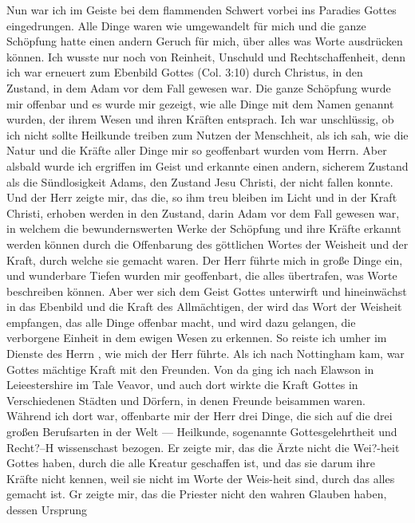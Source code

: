 Nun war ich im Geiste bei dem flammenden Schwert vorbei
ins Paradies Gottes eingedrungen. Alle Dinge waren wie 
umgewandelt für mich und die ganze Schöpfung hatte einen andern
Geruch für mich, über alles was Worte ausdrücken können. Ich
wusste nur noch von Reinheit, Unschuld und Rechtschaffenheit, denn
ich war erneuert zum Ebenbild Gottes 
(Col. 3:10) durch Christus,
in den Zustand, in dem Adam vor dem Fall gewesen 
war. Die
ganze Schöpfung wurde mir offenbar und es wurde mir gezeigt,
wie alle Dinge mit dem Namen genannt wurden, der ihrem
Wesen und ihren Kräften entsprach. Ich war unschlüssig, ob ich
nicht sollte Heilkunde treiben zum Nutzen 
der Menschheit, als ich
sah, wie die Natur und die Kräfte aller Dinge mir so geoffenbart
wurden vom Herrn. Aber alsbald wurde ich ergriffen im Geist
und erkannte einen andern, sicherem Zustand als die Sündlosigkeit 
Adams, den Zustand Jesu Christi, der nicht fallen konnte.
Und der Herr zeigte mir, das die, so ihm treu bleiben im Licht
und in der Kraft Christi, erhoben werden in den Zustand, darin
Adam vor dem Fall gewesen war, in welchem die bewundernswerten 
Werke der Schöpfung und ihre Kräfte erkannt werden
können durch die Offenbarung des göttlichen Wortes der 
Weisheit und der Kraft, durch welche sie gemacht waren. Der Herr
führte mich in große Dinge ein, und wunderbare Tiefen wurden
mir geoffenbart, die alles übertrafen, was Worte beschreiben
können. Aber wer sich dem Geist Gottes unterwirft und 
hineinwächst in das Ebenbild und die Kraft des Allmächtigen, der wird
das Wort der Weisheit empfangen, das alle Dinge offenbar macht,
und wird dazu gelangen, die verborgene Einheit in dem ewigen
Wesen zu erkennen.
So reiste ich umher im Dienste des Herrn , wie mich der
Herr führte. Als ich nach Nottingham kam, war Gottes mächtige
Kraft mit den Freunden. Von da ging ich nach Elawson in
Leieestershire im Tale Veavor, und auch dort wirkte die Kraft
Gottes in Verschiedenen Städten und Dörfern, in denen Freunde
beisammen waren. Während ich dort war, offenbarte mir der
Herr drei Dinge, die sich auf die drei großen Berufsarten in der
Welt — Heilkunde, sogenannte Gottesgelehrtheit und Recht?--H
wissenschast bezogen. Er zeigte mir, das die Ärzte nicht die
Wei?-heit Gottes haben, durch die alle Kreatur geschaffen ist, und
das sie darum ihre Kräfte nicht kennen, weil sie nicht im Worte der
Weis-heit sind, durch das alles gemacht ist. Gr zeigte mir, das
die Priester nicht den wahren Glauben haben, dessen Ursprung
